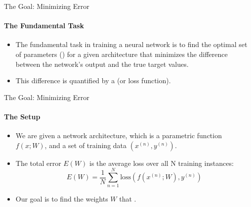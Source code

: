 \begin{frame}{The Goal: Minimizing Error}
    \framesubtitle{The Fundamental Task}
    \begin{itemize}
        \item The fundamental task in training a neural network is to find the optimal set of parameters () for a given architecture that minimizes the difference between the network's output and the true target values.
        \item This difference is quantified by a  (or loss function).
    \end{itemize}
\end{frame}

\begin{frame}{The Goal: Minimizing Error}
    \framesubtitle{The Setup}
    \begin{itemize}
        \item We are given a network architecture, which is a parametric function $f(x; W)$, and a set of training data $(x^{(n)}, y^{(n)})$.
        \item The total error $E(W)$ is the average loss over all N training instances:
        \[
            E(W) = \frac{1}{N} \sum_{n=1}^{N} \text{loss}(f(x^{(n)}; W), y^{(n)})
        \]
        \item Our goal is to find the weights $W$ that .
    \end{itemize}
\end{frame}